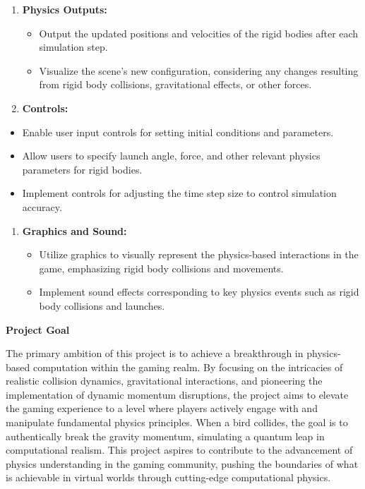 \documentclass[
]{article}
\begin{document}
\begin{enumerate}
\def\labelenumi{\arabic{enumi}.}
\setcounter{enumi}{3}
\item
  \textbf{Physics Outputs:}

  \begin{itemize}
  \item
    Output the updated positions and velocities of the rigid bodies
    after each simulation step.
  \item
    Visualize the scene's new configuration, considering any changes
    resulting from rigid body collisions, gravitational effects, or
    other forces.
  \end{itemize}
\item
  \textbf{Controls:}
\end{enumerate}

\begin{itemize}
\item
  Enable user input controls for setting initial conditions and
  parameters.
\item
  Allow users to specify launch angle, force, and other relevant physics
  parameters for rigid bodies.
\item
  Implement controls for adjusting the time step size to control
  simulation accuracy.
\end{itemize}

\begin{enumerate}
\def\labelenumi{\arabic{enumi}.}
\setcounter{enumi}{5}
\item
  \textbf{Graphics and Sound:}

  \begin{itemize}
  \item
    Utilize graphics to visually represent the physics-based
    interactions in the game, emphasizing rigid body collisions and
    movements.
  \item
    Implement sound effects corresponding to key physics events such as
    rigid body collisions and launches.
  \end{itemize}
\end{enumerate}

\textbf{Project Goal}

The primary ambition of this project is to achieve a breakthrough in
physics-based computation within the gaming realm. By focusing on the
intricacies of realistic collision dynamics, gravitational interactions,
and pioneering the implementation of dynamic momentum disruptions, the
project aims to elevate the gaming experience to a level where players
actively engage with and manipulate fundamental physics principles. When
a bird collides, the goal is to authentically break the gravity
momentum, simulating a quantum leap in computational realism. This
project aspires to contribute to the advancement of physics
understanding in the gaming community, pushing the boundaries of what is
achievable in virtual worlds through cutting-edge computational physics.
\end{document}

